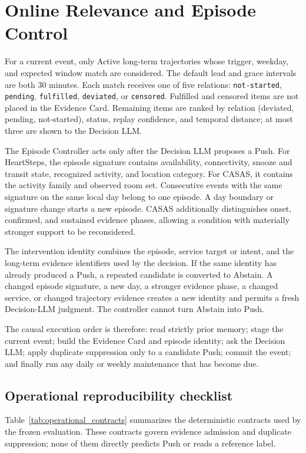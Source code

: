 \documentclass[sigconf,anonymous,review]{acmart}
\begin{document}
\section{Online Relevance and Episode Control}

For a current event, only Active long-term trajectories whose trigger, weekday,
and expected window match are considered.  The default
lead and grace intervals are both 30 minutes.  Each match receives one of five
relations: \texttt{not-started}, \texttt{pending}, \texttt{fulfilled},
\texttt{deviated}, or \texttt{censored}.  Fulfilled and censored items are not
placed in the Evidence Card.  Remaining items are ranked by relation
(deviated, pending, not-started), status, replay confidence, and temporal
distance; at most three are shown to the Decision LLM.

The Episode Controller acts only after the Decision LLM proposes a Push.
For HeartSteps, the episode signature contains availability, connectivity,
snooze and transit state, recognized activity, and location category.  For
CASAS, it contains the activity family and observed room set.  Consecutive
events with the same signature on the same local day belong to one episode.
A day boundary or signature change starts a new episode.  CASAS additionally
distinguishes onset, confirmed, and sustained evidence phases, allowing a
condition with materially stronger support to be reconsidered.

The intervention identity combines the episode, service target or intent, and
the long-term evidence identifiers used by the decision.  If the same identity
has already produced a Push, a repeated candidate is converted to Abstain.
A changed episode signature, a new day, a stronger evidence phase, a changed
service, or changed trajectory evidence creates a new identity and permits a
fresh Decision-LLM judgment.  The controller cannot turn Abstain into Push.

The causal execution order is therefore: read strictly prior memory; stage the
current event; build the Evidence Card and episode identity; ask the Decision
LLM; apply duplicate suppression only to a candidate Push; commit the event;
and finally run any daily or weekly maintenance that has become due.

\subsection{Operational reproducibility checklist}

Table~\ref{tab:operational_contracts} summarizes the deterministic contracts
used by the frozen evaluation.  These contracts govern evidence admission and
duplicate suppression; none of them directly predicts Push or reads a reference
label.
\end{document}
